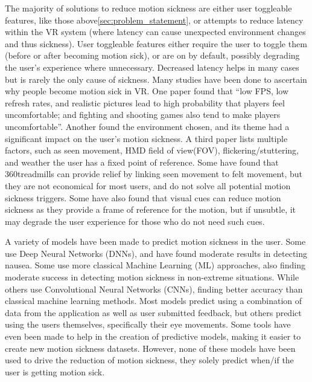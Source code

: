 The majority of solutions to reduce motion sickness are either user toggleable features, like those above\ref{sec:problem_statement}, or attempts to reduce latency within the VR system\cite{kundu2021study} (where latency can cause unexpected environment changes and thus sickness).
User toggleable features either require the user to toggle them (before or after becoming motion sick), or are on by default, possibly degrading the user's experience where unnecessary.
Decreased latency helps in many cases but is rarely the only cause of sickness.
Many studies have been done to ascertain why people become motion sick in VR\@.
One paper found that ``low FPS, low refresh rates, and realistic pictures lead to high probability that players feel uncomfortable; and fighting and shooting games also tend to make players uncomfortable''\cite{9236907}.
Another found the environment chosen, and its theme had a significant impact on the user's motion sickness\cite{9133071}.
A third paper lists multiple factors, such as seen movement, HMD field of view(FOV), flickering/stuttering, and weather the user has a fixed point of reference\cite{doi:10.1080/10447318.2020.1778351}.
Some have found that 360\textdegree treadmills can provide relief\cite{10.1117/12.2626662} by linking seen movement to felt movement, but they are not economical for most users, and do not solve all potential motion sickness triggers.
Some have also found that visual cues can reduce motion sickness\cite{10.1145/3544999.3552489} as they provide a frame of reference for the motion, but if unsubtle, it may degrade the user experience for those who do not need such cues.

A variety of models have been made to predict motion sickness in the user.
Some use Deep Neural Networks (DNNs)\cite{8613651}, and have found moderate results in detecting nausea.
Some use more classical Machine Learning (ML) approaches\cite{8267239}, also finding moderate success in detecting motion sickness in non-extreme situations.
While others use Convolutional Neural Networks (CNNs)\cite{8642906}, finding better accuracy than classical machine learning methods.
Most models predict using a combination of data from the application as well as user submitted feedback, but others predict using the users themselves, specifically their eye movements\cite{9234030,https://doi.org/10.1111/cgf.14703}.
Some tools have even been made to help in the creation of predictive models\cite{10.1145/3526113.3545656}, making it easier to create new motion sickness datasets.
However, none of these models have been used to drive the reduction of motion sickness, they solely predict when/if the user is getting motion sick.

